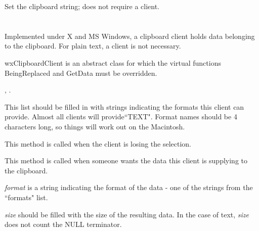 
Set the clipboard string; does not require a client.

\section{}\label{wxclipboardclient}

Implemented under X and MS Windows, a clipboard client holds data
belonging to the clipboard. For plain text, a client is not necessary.

wxClipboardClient is an abstract class for which the virtual functions
BeingReplaced and GetData must be overridden.




, .




This list should be filled in with strings indicating the formats
this client can provide. Almost all clients will provide``TEXT".
Format names should be 4 characters long, so things will work
out on the Macintosh.



This method is called when the client is losing the selection.



This method is called when someone wants the data this client is
supplying to the clipboard.

{\it format} is a string indicating the
format of the data - one of the strings from the ``formats"
list.

{\it size} should be filled with the size of the resulting
data. In the case of text, {\it size} does not count the
NULL terminator.


